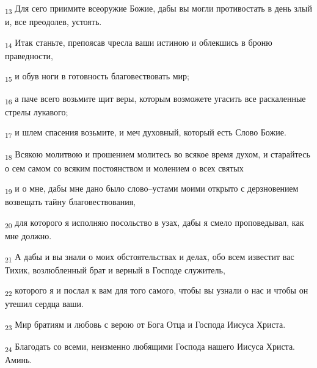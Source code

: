 \begin{tcolorbox}
\textsubscript{13} Для сего приимите всеоружие Божие, дабы вы могли противостать в день злый и, все преодолев, устоять.
\end{tcolorbox}
\begin{tcolorbox}
\textsubscript{14} Итак станьте, препоясав чресла ваши истиною и облекшись в броню праведности,
\end{tcolorbox}
\begin{tcolorbox}
\textsubscript{15} и обув ноги в готовность благовествовать мир;
\end{tcolorbox}
\begin{tcolorbox}
\textsubscript{16} а паче всего возьмите щит веры, которым возможете угасить все раскаленные стрелы лукавого;
\end{tcolorbox}
\begin{tcolorbox}
\textsubscript{17} и шлем спасения возьмите, и меч духовный, который есть Слово Божие.
\end{tcolorbox}
\begin{tcolorbox}
\textsubscript{18} Всякою молитвою и прошением молитесь во всякое время духом, и старайтесь о сем самом со всяким постоянством и молением о всех святых
\end{tcolorbox}
\begin{tcolorbox}
\textsubscript{19} и о мне, дабы мне дано было слово--устами моими открыто с дерзновением возвещать тайну благовествования,
\end{tcolorbox}
\begin{tcolorbox}
\textsubscript{20} для которого я исполняю посольство в узах, дабы я смело проповедывал, как мне должно.
\end{tcolorbox}
\begin{tcolorbox}
\textsubscript{21} А дабы и вы знали о моих обстоятельствах и делах, обо всем известит вас Тихик, возлюбленный брат и верный в Господе служитель,
\end{tcolorbox}
\begin{tcolorbox}
\textsubscript{22} которого я и послал к вам для того самого, чтобы вы узнали о нас и чтобы он утешил сердца ваши.
\end{tcolorbox}
\begin{tcolorbox}
\textsubscript{23} Мир братиям и любовь с верою от Бога Отца и Господа Иисуса Христа.
\end{tcolorbox}
\begin{tcolorbox}
\textsubscript{24} Благодать со всеми, неизменно любящими Господа нашего Иисуса Христа. Аминь.
\end{tcolorbox}
